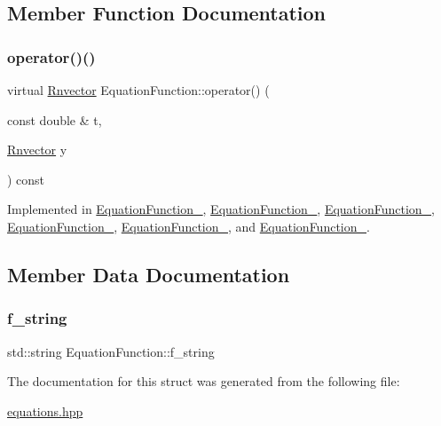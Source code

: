 \subsection{Member Function Documentation}
\mbox{\label{structEquationFunction_ade0f7a750ab9e61eea68636ced6dc1b7}} 
\subsubsection{\texorpdfstring{operator()()}{operator()()}}
{\footnotesize\ttfamily virtual \hyperlink{utils_8hpp_a8e0cccfe9e5cee5140bfcfbd9a3a6a0e}{Rnvector} Equation\+Function\+::operator() (\begin{DoxyParamCaption}\item[{const double \&}]{t,  }\item[{\hyperlink{utils_8hpp_a8e0cccfe9e5cee5140bfcfbd9a3a6a0e}{Rnvector}}]{y }\end{DoxyParamCaption}) const\hspace{0.3cm}{\ttfamily [pure virtual]}}



Implemented in \hyperlink{structEquationFunction__6_ab3495f4f08e69f8ce99e9feac9a15eb2}{Equation\+Function\+\_}, \hyperlink{structEquationFunction__5_a2279d1fd62c1e2e5f1193ff5686beab4}{Equation\+Function\+\_}, \hyperlink{structEquationFunction__4_add98470227ffa4d8ef59e67f89c7ce43}{Equation\+Function\+\_}, \hyperlink{structEquationFunction__3_a304fca5cdb905f3d498ebacbff323c50}{Equation\+Function\+\_}, \hyperlink{structEquationFunction__2_ac1602012658612cac3e53fcacbcb710c}{Equation\+Function\+\_}, and \hyperlink{structEquationFunction__1_aff18a2dd1fae6d49016f1eccead8e62f}{Equation\+Function\+\_}.



\subsection{Member Data Documentation}
\mbox{\label{structEquationFunction_a21ef5c7c24a9d4539d150479a07eea32}} 
\subsubsection{\texorpdfstring{f\+\_\+string}{f\_string}}
{\footnotesize\ttfamily std\+::string Equation\+Function\+::f\+\_\+string}



The documentation for this struct was generated from the following file\+:\begin{DoxyCompactItemize}
\item 
\hyperlink{equations_8hpp}{equations.\+hpp}\end{DoxyCompactItemize}
